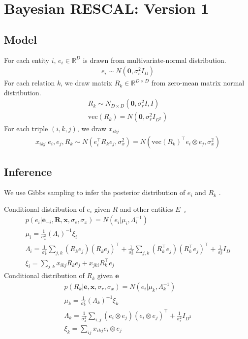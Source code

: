 \documentclass{article}
\theoremstyle{definition}
\begin{document}
 
\section{Bayesian RESCAL: Version 1}
\subsection{Model}

For each entity $i$, $e_i \in \mathbb{R}^{D}$ is drawn from multivariate-normal distribution.
\begin{align}
e_i \sim {N}(\mathbf{0}, \sigma_e^2{I}_D)
\end{align}
For each relation $k$, we draw matrix $R_k \in \mathbb{R}^{D\times D}$ from zero-mean matrix normal distribution.
\begin{align}
R_k \sim {N}_{D \times D}(\mathbf{0}, \sigma_r^2{I}, {I}) \\
\text{vec}(R_k) = N(\mathbf{0}, \sigma_r^2 I_{D^2})
\end{align}
For each triple $(i,k,j)$, we draw $x_{ikj}$ 
\begin{align}
x_{ikj} |e_i, e_j, R_k \sim N(e_i^{\top} R_k e_j, \sigma_x^2) = N(\text{vec}(R_k)^{\top} e_i \otimes e_j, \sigma_x^2)
\end{align}

\subsection{Inference}
We use Gibbs sampling to infer the posterior distribution of $e_i$ and $R_k$ \cite{Salakhutdinov2008}.

Conditional distribution of $e_i$ given $R$ and other entities $E_{-i}$
\begin{align}
p(e_i |\mathbf{e}_{-i}, \mathbf{R}, \mathbf{x}, \sigma_e, \sigma_x) = N(e_i | \mu_i, \Lambda_i^{-1})\\
\mu_i = \frac{1}{\sigma_x^2}(\Lambda_i)^{-1}\xi_i \\
\Lambda_i = \frac{1}{\sigma_x^2} \sum_{j,k} (R_k e_j)(R_k e_j)^\top + \frac{1}{\sigma_x^2} \sum_{j,k} (R_k^\top e_j)(R_k^\top e_j)^\top+ \frac{1}{\sigma_e^2} {I}_D\\
\xi_i = \sum_{j,k} x_{ikj} R_{k} e_{j} + x_{jki} R_{k}^\top e_{j}
\end{align}
Conditional distribution of $R_k$ given $\mathbf{e}$
\begin{align}
p(R_k|\mathbf{e}, \mathbf{x}, \sigma_r, \sigma_x)  = N(e_i | \mu_k, \Lambda_k^{-1})\\
\mu_k = \frac{1}{\sigma_x^2}(\Lambda_k)^{-1}\xi_k \\
\Lambda_k = \frac{1}{\sigma_x^2} \sum_{i,j} (e_i \otimes e_j)(e_i \otimes e_j)^\top + \frac{1}{\sigma_r^2} {I}_{D^2}\\
\xi_k = \sum_{ij} x_{ikj} e_{i} \otimes e_{j}
\end{align}





\end{document}
